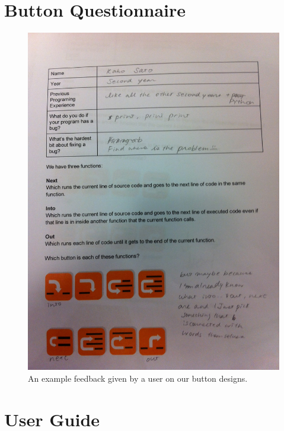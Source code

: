 \documentclass[11pt, a4paper]{article}
\begin{document}
\section{Button Questionnaire}
\label{sec:buttonquestionnaire}
\begin{figure}[h!]
\centering
\includegraphics[width=\textwidth]{questionnair2.jpg}
\caption{An example feedback given by a user on our button designs.}
\end{figure}

\section{User Guide}
\end{document}
